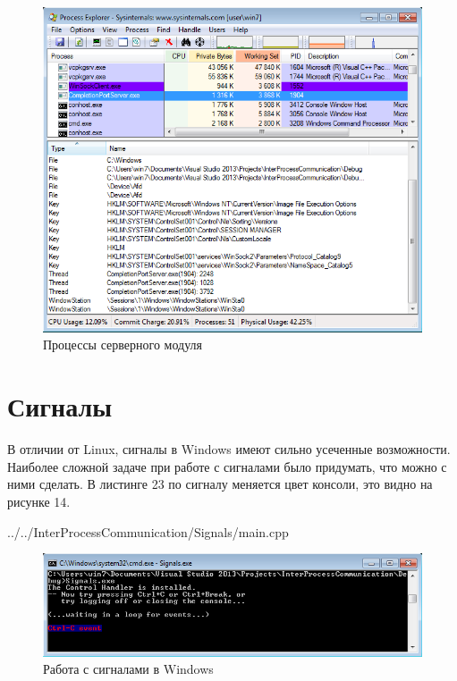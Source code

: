 \documentclass[a4paper, 12pt]{report}		%
\begin{document}
\begin{figure}[h!]
\centering
\includegraphics[scale=0.8]{res/13_Process_Explorer}
\caption{Процессы серверного модуля}
\end{figure}

\chapter*{Сигналы}

В отличии от Linux, сигналы в Windows имеют сильно усеченные возможности. Наиболее сложной задаче при работе с сигналами было придумать, что можно с ними сделать. В листинге 23 по сигналу меняется цвет консоли, это видно на рисунке 14.


{../../InterProcessCommunication/Signals/main.cpp}
\vspace{1em}

\begin{figure}[h!]
\centering
\includegraphics[scale=0.95]{res/14_Signals}
\caption{Работа с сигналами в Windows}
\end{figure}
\end{document}
